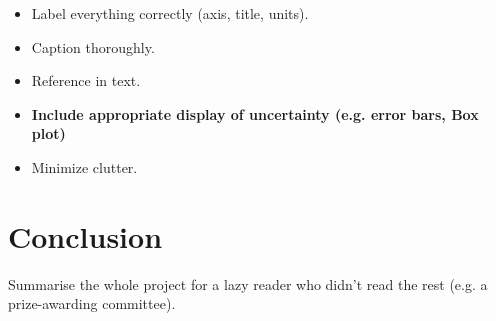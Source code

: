 \documentclass{l4proj}
\begin{document}
\begin{itemize}
\item Label everything correctly (axis, title, units).
\item Caption thoroughly.
\item Reference in text.
\item \textbf{Include appropriate display of uncertainty (e.g. error bars, Box plot)}
\item Minimize clutter.
\end{itemize}



\chapter{Conclusion}    
Summarise the whole project for a lazy reader who didn't read the rest (e.g. a prize-awarding committee).
\end{document}
